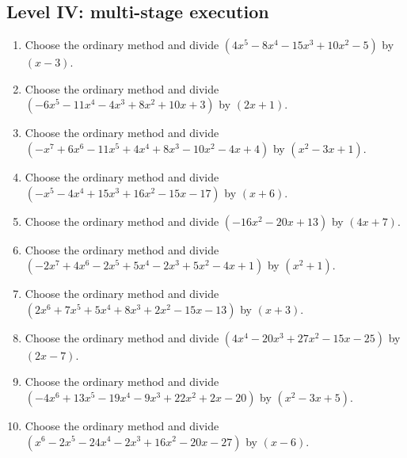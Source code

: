 \documentclass[11pt,oneside]{book}
\begin{document}
\subsection*{Level IV: multi-stage execution}
\begin{enumerate}[leftmargin=*,label=\textbf{\arabic*.},itemsep=0.65\baselineskip]
\item Choose the ordinary method and divide $(4 x^{5} - 8 x^{4} - 15 x^{3} + 10 x^{2} - 5)$ by $(x - 3)$.
\item Choose the ordinary method and divide $(- 6 x^{5} - 11 x^{4} - 4 x^{3} + 8 x^{2} + 10 x + 3)$ by $(2 x + 1)$.
\item Choose the ordinary method and divide $(- x^{7} + 6 x^{6} - 11 x^{5} + 4 x^{4} + 8 x^{3} - 10 x^{2} - 4 x + 4)$ by $(x^{2} - 3 x + 1)$.
\item Choose the ordinary method and divide $(- x^{5} - 4 x^{4} + 15 x^{3} + 16 x^{2} - 15 x - 17)$ by $(x + 6)$.
\item Choose the ordinary method and divide $(- 16 x^{2} - 20 x + 13)$ by $(4 x + 7)$.
\item Choose the ordinary method and divide $(- 2 x^{7} + 4 x^{6} - 2 x^{5} + 5 x^{4} - 2 x^{3} + 5 x^{2} - 4 x + 1)$ by $(x^{2} + 1)$.
\item Choose the ordinary method and divide $(2 x^{6} + 7 x^{5} + 5 x^{4} + 8 x^{3} + 2 x^{2} - 15 x - 13)$ by $(x + 3)$.
\item Choose the ordinary method and divide $(4 x^{4} - 20 x^{3} + 27 x^{2} - 15 x - 25)$ by $(2 x - 7)$.
\item Choose the ordinary method and divide $(- 4 x^{6} + 13 x^{5} - 19 x^{4} - 9 x^{3} + 22 x^{2} + 2 x - 20)$ by $(x^{2} - 3 x + 5)$.
\item Choose the ordinary method and divide $(x^{6} - 2 x^{5} - 24 x^{4} - 2 x^{3} + 16 x^{2} - 20 x - 27)$ by $(x - 6)$.
\end{enumerate}
\end{document}
